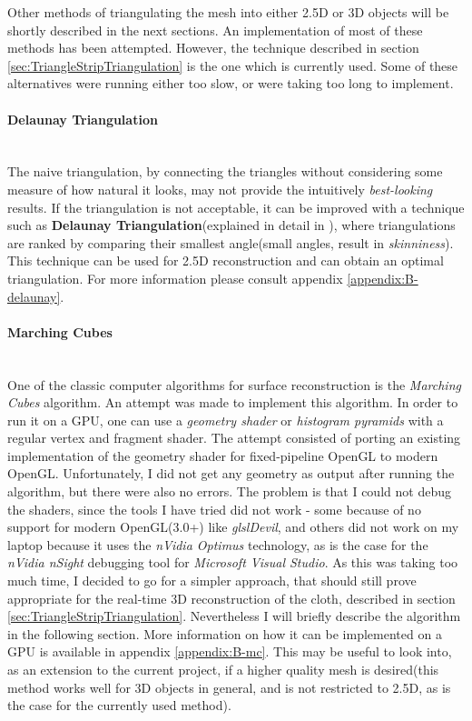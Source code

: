 \documentclass[]{article}
\begin{document}
Other methods of triangulating the mesh into either 2.5D or 3D objects will be shortly described in the next sections. An implementation of most of these methods has been attempted. However, the technique described in section \ref{sec:TriangleStripTriangulation} is the one which is currently used. Some of these alternatives were running either too slow, or were taking too long to implement.

\paragraph{Delaunay Triangulation}\mbox{}\\

The naive triangulation, by connecting the triangles without considering some measure of how natural it looks, may not provide the intuitively \textit{best-looking} results. If the triangulation is not acceptable, it can be improved with a technique such as \textbf{Delaunay Triangulation}(explained in detail in \cite[Chapter~9]{berg08}), where triangulations are ranked by comparing their smallest angle(small angles, result in \textit{skinniness}). This technique can be used for 2.5D reconstruction and can obtain an optimal triangulation. For more information please consult appendix \ref{appendix:B-delaunay}.

\paragraph{Marching Cubes}\mbox{}\\

One of the classic computer algorithms for surface reconstruction is the \textit{Marching Cubes}  algorithm. An attempt was made to implement this algorithm. In order to run it on a GPU, one can use a \textit{geometry shader} or\textit{ histogram pyramids} with a regular vertex and fragment shader. The attempt consisted of porting an existing implementation of the geometry shader for fixed-pipeline OpenGL to modern OpenGL. Unfortunately, I did not get any geometry as output after running the algorithm, but there were also no errors. The problem is that I could not debug the shaders, since the tools I have tried did not work - some because of no support for modern OpenGL(3.0+) like \textit{glslDevil}, and others did not work on my laptop because it uses the \textit{nVidia Optimus} technology, as is the case for the \textit{nVidia nSight} debugging tool for \textit{Microsoft Visual Studio}. As this was taking too much time, I decided to go for a simpler approach, that should still prove appropriate for the real-time 3D reconstruction of the cloth, described in section \ref{sec:TriangleStripTriangulation}. Nevertheless I will briefly describe the algorithm in the following section. More information on how it can be implemented on a GPU is available in appendix \ref{appendix:B-mc}. This may be useful to look into, as an extension to the current project, if a higher quality mesh is desired(this method works well for 3D objects in general, and is not restricted to 2.5D, as is the case for the currently used method).
\end{document}
